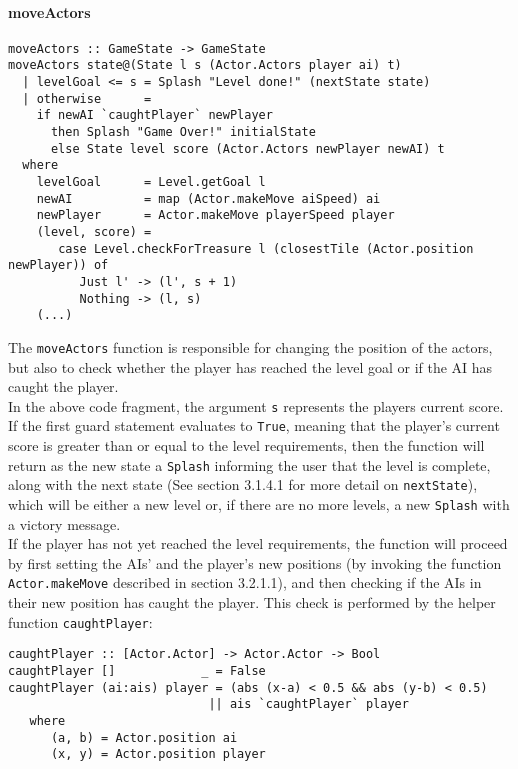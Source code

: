 \documentclass{article}
\begin{document}
\paragraph{moveActors}
\begin{verbatim}
moveActors :: GameState -> GameState
moveActors state@(State l s (Actor.Actors player ai) t)
  | levelGoal <= s = Splash "Level done!" (nextState state)
  | otherwise      =
    if newAI `caughtPlayer` newPlayer
      then Splash "Game Over!" initialState
      else State level score (Actor.Actors newPlayer newAI) t
  where
    levelGoal      = Level.getGoal l
    newAI          = map (Actor.makeMove aiSpeed) ai
    newPlayer      = Actor.makeMove playerSpeed player
    (level, score) =
       case Level.checkForTreasure l (closestTile (Actor.position newPlayer)) of
          Just l' -> (l', s + 1)
          Nothing -> (l, s)
    (...)
\end{verbatim}
		The \texttt{moveActors} function is responsible for changing the position of the actors, but also to check whether the player has reached the level goal or if the AI has caught the player. \\
		\newline
        In the above code fragment, the argument \texttt{s} represents the players current score. If the first guard statement evaluates to \texttt{True}, meaning that the player's current score is greater than or equal to the level requirements, then the function will return as the new state a \texttt{Splash} informing the user that the level is complete, along with the next state (See section 3.1.4.1 for more detail on \texttt{nextState}), which will be either a new level or, if there are no more levels, a new \texttt{Splash} with a victory message. \\
        \newline
        If the player has not yet reached the level requirements, the function will proceed by first setting the AIs' and the player's new positions (by invoking the function \texttt{Actor.makeMove} described in section 3.2.1.1), and then checking if the AIs in their new position has caught the player. This check is performed by the helper function \texttt{caughtPlayer}: \\

\begin{verbatim}
caughtPlayer :: [Actor.Actor] -> Actor.Actor -> Bool
caughtPlayer []            _ = False
caughtPlayer (ai:ais) player = (abs (x-a) < 0.5 && abs (y-b) < 0.5)
                            || ais `caughtPlayer` player
   where
      (a, b) = Actor.position ai
      (x, y) = Actor.position player
\end{verbatim}
\end{document}

